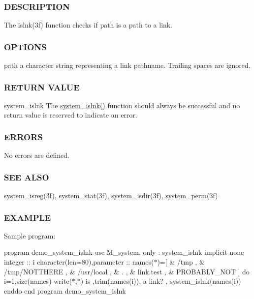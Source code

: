 \subsubsection*{D\+E\+S\+C\+R\+I\+P\+T\+I\+ON}

The islnk(3f) function checks if path is a path to a link.

\subsubsection*{O\+P\+T\+I\+O\+NS}

path a character string representing a link pathname. Trailing spaces are ignored.

\subsubsection*{R\+E\+T\+U\+RN V\+A\+L\+UE}

system\+\_\+islnk The \mbox{\hyperlink{namespacem__system_a268d0cd27be36527894fe2cae0f1b9f6}{system\+\_\+islnk()}} function should always be successful and no return value is reserved to indicate an error.

\subsubsection*{E\+R\+R\+O\+RS}

No errors are defined.

\subsubsection*{S\+EE A\+L\+SO}

system\+\_\+isreg(3f), system\+\_\+stat(3f), system\+\_\+isdir(3f), system\+\_\+perm(3f)

\subsubsection*{E\+X\+A\+M\+P\+LE}

Sample program\+:

program demo\+\_\+system\+\_\+islnk use M\+\_\+system, only \+: system\+\_\+islnk implicit none integer \+:\+: i character(len=80),parameter \+:\+: names($\ast$)=\mbox{[} \& \textquotesingle{}/tmp \textquotesingle{}, \& \textquotesingle{}/tmp/\+N\+O\+T\+T\+H\+E\+RE \textquotesingle{}, \& \textquotesingle{}/usr/local \textquotesingle{}, \& \textquotesingle{}. \textquotesingle{}, \& \textquotesingle{}link.\+test \textquotesingle{}, \& \textquotesingle{}P\+R\+O\+B\+A\+B\+L\+Y\+\_\+\+N\+OT \textquotesingle{}\mbox{]} do i=1,size(names) write($\ast$,$\ast$)\textquotesingle{} is \textquotesingle{},trim(names(i)),\textquotesingle{} a link? \textquotesingle{}, system\+\_\+islnk(names(i)) enddo end program demo\+\_\+system\+\_\+islnk

